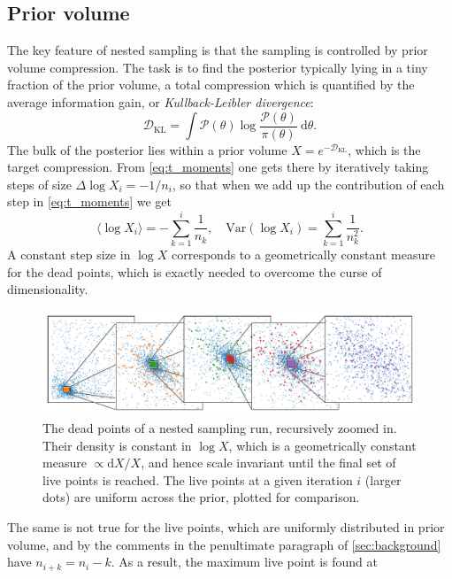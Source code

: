 \documentclass[usenatbib]{mnras}
\newcommand{\DKL}{\mathcal{D}_\mathrm{KL}}
\begin{document}
\subsection{Prior volume}\label{sec:prior_volume}
The key feature of nested sampling is that the sampling is controlled by prior volume compression. The task is to find the posterior typically lying in a tiny fraction of the prior volume, a total compression which is quantified by the average information gain, or \textit{Kullback-Leibler divergence}:
\begin{equation}\label{eq:DKL}
   \DKL = \int \mathcal{P}(\theta) \log \frac{\mathcal{P}(\theta)}{\pi(\theta)}\ \mathrm{d}\theta. 
\end{equation}
The bulk of the posterior lies within a prior volume ${X = e^{-\DKL}}$, which is the target compression. From \cref{eq:t_moments} one gets there by iteratively taking steps of size ${\Delta \log X_i = -1/n_i}$, so that when we add up the contribution of each step in \eqref{eq:t_moments} we get
\begin{equation}
    \langle\log X_i\rangle = -\sum_{k=1}^i \frac{1}{n_k}, \quad \mathrm{Var}(\log X_i) = \sum_{k=1}^i \frac{1}{n_k^2}.
\end{equation}
A constant step size in $\log X$ corresponds to a geometrically constant measure for the dead points, which is exactly needed to overcome the curse of dimensionality.
\begin{figure}
\begin{center}
    \includegraphics{figures/dead_measure_live.pdf}
\end{center}
\caption{The dead points of a nested sampling run, recursively zoomed in. Their density is constant in $\log X$, which is a geometrically constant measure $\propto \mathrm{d} X/X$, and hence scale invariant until the final set of live points is reached. The live points at a given iteration $i$ (larger dots) are uniform across the prior, plotted for comparison.}
\label{fig:dead_measure}
\end{figure}
\par
The same is not true for the live points, which are uniformly distributed in prior volume, and by the comments in the penultimate paragraph of \cref{sec:background} have ${n_{i+k} = n_i-k}$. As a result, the maximum live point is found at 
\end{document}

